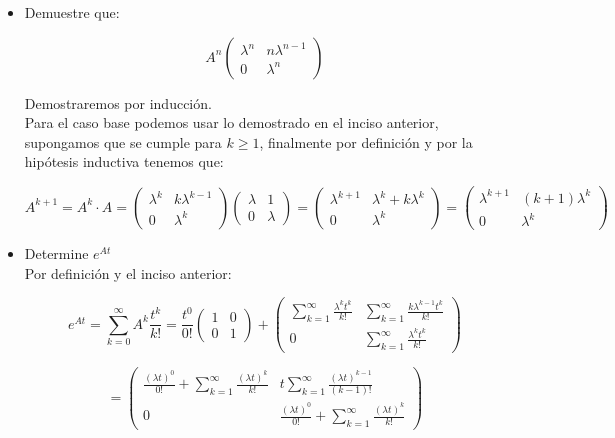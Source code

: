 \begin{itemize}
    \item Demuestre que: 
    
    $$A^n\begin{pmatrix}
    \lambda^n & n \lambda^{n-1}\\
    0 & \lambda^n
    \end{pmatrix}$$
    
    Demostraremos por inducción.\\
    
    Para el caso base podemos usar lo demostrado en el inciso anterior, supongamos que se cumple para $k \geq 1$, finalmente por definición y por la hipótesis inductiva tenemos que: 
    
    $$A^{k+1}= A^{k} \cdot A= \begin{pmatrix}
    \lambda^{k} & k \lambda^{k-1}\\
    0 & \lambda^{k}
    \end{pmatrix}
    \begin{pmatrix}
    \lambda & 1\\
    0 & \lambda
    \end{pmatrix}= 
    \begin{pmatrix}
    \lambda^{k+1} & \lambda^{k}+k \lambda^{k}\\
    0 & \lambda^{k}
    \end{pmatrix}=
    \begin{pmatrix}
    \lambda^{k+1} & (k+1) \lambda^{k}\\
    0 & \lambda^{k}
    \end{pmatrix}$$
    \item Determine $e^{At}$\\
    
    Por definición y el inciso anterior: 
    
    $$e^{At}= \displaystyle \sum_{k=0}^{\infty} A^k \frac{t^k}{k!}= \frac{t^0}{0!} \begin{pmatrix}
    1 & 0\\
    0 & 1
    \end{pmatrix}+ 
    \begin{pmatrix}
    \displaystyle \sum_{k=1}^{\infty} \frac{\lambda^k t^k}{k!} & \displaystyle \sum_{k=1}^{\infty} \frac{ k \lambda^{k-1} t^k}{k!}\\
    0 & \displaystyle \sum_{k=1}^{\infty} \frac{ \lambda^{k} t^{k}}{k!}
    \end{pmatrix}$$
    
    $$= \begin{pmatrix}
    \frac{(\lambda t)^0}{0!} + \displaystyle \sum_{k=1}^{\infty} \frac{(\lambda t)^k}{k!} & t \displaystyle \sum_{k=1}^{\infty} \frac{(\lambda t)^{k-1}}{(k-1)!}\\
    0 & \frac{(\lambda t)^0}{0!}+ \displaystyle \sum_{k=1}^{\infty} \frac{(\lambda t)^k}{k!}
    \end{pmatrix}$$ 
    

\end{itemize}

